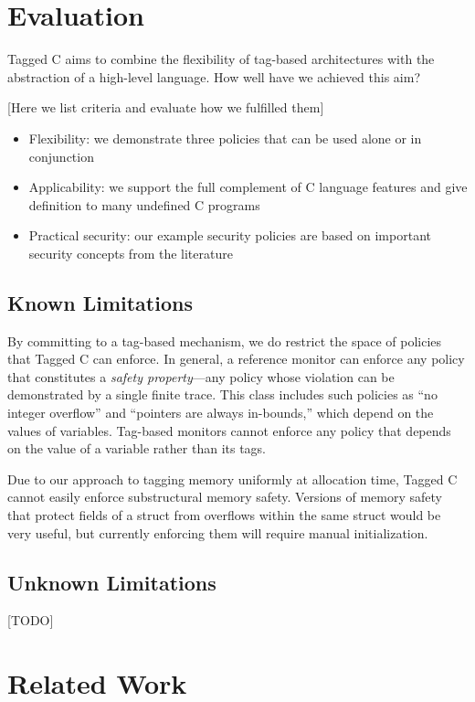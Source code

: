 \documentclass{llncs}
\begin{document}
\section{Evaluation}
\label{sec:evaluation}

Tagged C aims to combine the flexibility of tag-based architectures with the abstraction
of a high-level language. How well have we achieved this aim?

[Here we list criteria and evaluate how we fulfilled them]

\begin{itemize}
\item Flexibility: we demonstrate three policies that can be used alone or in conjunction
\item Applicability: we support the full complement of C language features and give definition
  to many undefined C programs
\item Practical security: our example security policies are based on important security concepts
  from the literature
\end{itemize}

\subsection{Known Limitations}

By committing to a tag-based mechanism, we do restrict the space of policies that Tagged C
can enforce. In general, a reference monitor can enforce any policy that constitutes a
{\em safety property}---any policy whose violation can be demonstrated by a single finite
trace. This class includes such policies as ``no integer overflow'' and ``pointers are always in-bounds,''
which depend on the values of variables. Tag-based monitors cannot enforce any policy that
depends on the value of a variable rather than its tags.

Due to our approach to tagging memory uniformly at allocation time, Tagged C cannot easily
enforce substructural memory safety. Versions of memory safety that protect fields of a
struct from overflows within the same struct would be very useful, but currently enforcing
them will require manual initialization.

\subsection{Unknown Limitations}

[TODO]

\section{Related Work}
\end{document}
